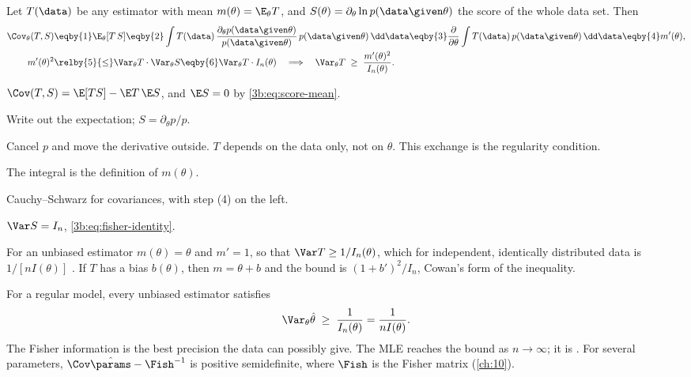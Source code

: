 Let $T(\data)$ be any estimator with mean $m(\theta)=\E_\theta T$, and
$S(\theta)=\partial_\theta\ln p(\data\given\theta)$ the score of the whole
data set. Then
\begin{align}
  \Cov_\theta(T,S)
  &\eqby{1}\E_\theta[T\,S]
  \eqby{2}\int T(\data)\,\frac{\partial_\theta p(\data\given\theta)}{p(\data\given\theta)}\,p(\data\given\theta)\,\dd\data
  \eqby{3}\frac{\partial}{\partial\theta}\int T(\data)\,p(\data\given\theta)\,\dd\data
  \eqby{4}m'(\theta),
  \nonumber\\
  m'(\theta)^2
  &\relby{5}{\le}\Var_\theta T\cdot\Var_\theta S
  \eqby{6}\Var_\theta T\cdot I_n(\theta)
  \quad\Longrightarrow\quad
  \Var_\theta T\;\ge\;\frac{m'(\theta)^2}{I_n(\theta)} .
  \label{3b:eq:cramer-rao}
\end{align}
\begin{explain}
  \item $\Cov(T,S)=\E[TS]-\E T\,\E S$, and $\E S=0$ by \eqref{3b:eq:score-mean}.
  \item Write out the expectation; $S=\partial_\theta p/p$.
  \item Cancel $p$ and move the derivative outside. $T$ depends on the data
        only, not on $\theta$. This exchange is the regularity condition.
  \item The integral is the definition of $m(\theta)$.
  \item Cauchy--Schwarz for covariances, with step (4) on the left.
  \item $\Var S=I_n$, \eqref{3b:eq:fisher-identity}.
\end{explain}
For an unbiased estimator $m(\theta)=\theta$ and $m'=1$, so that
$\Var T\ge1/I_n(\theta)$, which for independent, identically distributed
data is $1/[nI(\theta)]$ .
If $T$ has a bias $b(\theta)$, then $m=\theta+b$ and the bound is
$(1+b')^2/I_n$, Cowan's form of the inequality.

\begin{keyidea}
For a regular model, every unbiased estimator satisfies
\[
  \Var_\theta\hat\theta\;\ge\;\frac{1}{I_n(\theta)}=\frac{1}{nI(\theta)} .
\]
The Fisher information is the best precision the data can possibly give.
The MLE reaches the bound as $n\to\infty$; it is
. For several parameters,
$\Cov\hat\params-\Fish^{-1}$ is positive semidefinite, where $\Fish$ is the
Fisher matrix (\cref{ch:10}).
\end{keyidea}

